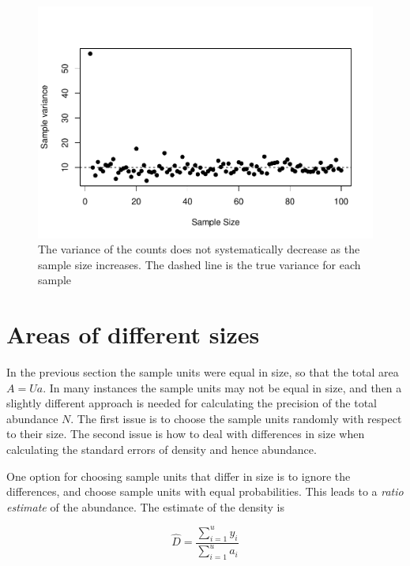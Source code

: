 \documentclass[]{book}
\theoremstyle{definition}
\theoremstyle{definition}
\theoremstyle{definition}
\theoremstyle{remark}
\begin{document}
\begin{figure}
\centering
\includegraphics{NRES450-LectureNotes_files/figure-latex/samplevar-1.pdf}
\caption{\label{fig:samplevar}The variance of the counts does not
systematically decrease as the sample size increases. The dashed line is
the true variance for each sample}
\end{figure}

\hypertarget{areas-of-different-sizes}{%
\section{Areas of different sizes}\label{areas-of-different-sizes}}

In the previous section the sample units were equal in size, so that the
total area \(A = Ua\). In many instances the sample units may not be
equal in size, and then a slightly different approach is needed for
calculating the precision of the total abundance \(N\). The first issue
is to choose the sample units randomly with respect to their size. The
second issue is how to deal with differences in size when calculating
the standard errors of density and hence abundance.

One option for choosing sample units that differ in size is to ignore
the differences, and choose sample units with equal probabilities. This
leads to a \emph{ratio estimate} of the abundance. The estimate of the
density is

\begin{equation}
  \hat{D} =  \frac{\sum_{i=1}^u{y_i}}{\sum_{i=1}^u{a_i}}
  \label{eq:densityRatio}
\end{equation}
\end{document}
